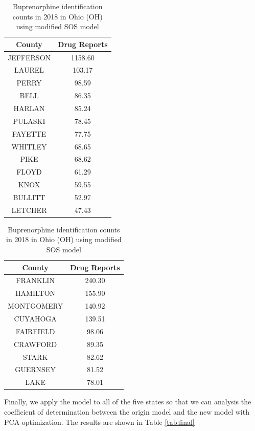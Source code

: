 \documentclass{mcmthesis}
\begin{document}
\begin{table}[H]
    \caption{ Results table for Optimizied SOS Model}
     \begin{subtable}[t]{0.45\linewidth}
     \centering
    \caption{Hydrocodone identification counts in 2008 in  Kentucky (KY) using modified SOS model}
    \label{tab:2008new}
    \begin{tabular}{|c|c|}
        \hline
County& Drug Reports  \\\hline
JEFFERSON&1158.60\\
LAUREL&103.17\\
PERRY&98.59\\
BELL&86.35\\
HARLAN&85.24\\
PULASKI&78.45\\
FAYETTE&77.75\\
WHITLEY&68.65\\
PIKE&68.62\\
FLOYD&61.29\\
KNOX&59.55\\
BULLITT&52.97\\
LETCHER&47.43\\
\hline
    \end{tabular}
\end{subtable}
\hfill

 \begin{subtable}[t]{0.45\linewidth}
    \centering
    \caption{Buprenorphine identification counts in 2018 in Ohio (OH) using modified SOS model}
    \label{tab:2018new}
    \begin{tabular}{|c|c|}\hline
      County& Drug Reports  \\\hline  
FRANKLIN&240.30\\
HAMILTON&155.90\\
MONTGOMERY&140.92\\
CUYAHOGA&139.51\\
FAIRFIELD&98.06\\
CRAWFORD&89.35\\
STARK&82.62\\
GUERNSEY&81.52\\
LAKE&78.01\\
\hline
    \end{tabular}
\end{subtable}
\end{table} 

Finally, we apply the model to all of the five states so that we can analysis the coefficient of determination between the origin model and the new model with PCA optimization. The results are shown in Table \ref{tab:final}
\end{document}
